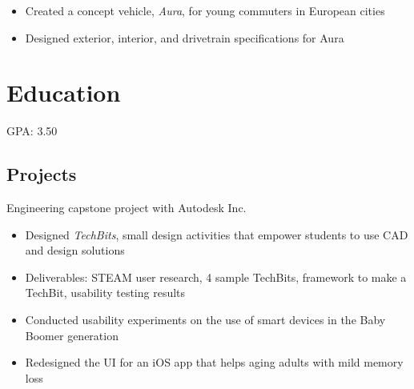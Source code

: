 \documentclass[10pt,a4paper,sans]{moderncv}        %
\begin{document}
{{}%
\begin{itemize} 
	\item  Created a concept vehicle, {\emph{Aura}}, for young commuters in European cities
	\item   Designed exterior, interior, and drivetrain specifications for Aura
\end{itemize}}




\bigskip

\section{Education}
\smallskip
{}
{GPA: 3.50}  %

\bigskip

\subsection{Projects}
{Engineering capstone project with Autodesk Inc.}
{{}%
\begin{itemize} 
 	\item Designed \textit{TechBits}, small design activities that empower students to use CAD and design solutions
	 \item Deliverables: STEAM user research, 4 sample TechBits, framework to make a TechBit, usability testing results
\end{itemize}}

{}
{{}%
\begin{itemize} 
 	\item Conducted usability experiments on the use of smart devices in the Baby Boomer generation
	 \item Redesigned the UI for an iOS app that helps aging adults with mild memory loss
\end{itemize}}

\end{document}
